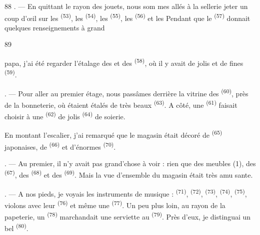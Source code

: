 \begin{VUpage}[90]{88}
. --- En quittant le rayon des jouets, nous som\cc
mes allés à la sellerie jeter un coup d'œil sur les\nl
{}\textsuperscript{(53)}, les \textsuperscript{(54)}, les \textsuperscript{(55)}, les\nl
{}\textsuperscript{(56)} et les  Pendant que le \nl
{}\textsuperscript{(57)} donnait quelques renseignements à grand
\parplein
\end{VUpage}

\begin{VUpage}[91]{89}

\VUcontinue
papa, j'ai été regarder l'étalage des  et\nl
des \textsuperscript{(58)}, où il y avait de jolis  et\nl
de fines \textsuperscript{(59)}.

. --- Pour aller au premier étage, nous passâmes\nl
derrière la vitrine des \textsuperscript{(60)}, près de la\nl
bonneterie, où étaient étalés de très beaux \cc
{}\textsuperscript{(63)}. A côté, une \textsuperscript{(61)}\nl
faisait choisir à une \textsuperscript{(62)} de jolis \textsuperscript{(64)}\nl
de soierie.

\VUblancAlinea
En montant l'escalier, j'ai remarqué que le magasin\nl
était décoré de \textsuperscript{(65)} japonaises, de \cc
{}\textsuperscript{(66)} et d'énormes \textsuperscript{(70)}.

. --- Au premier, il n'y avait pas grand'chose à\nl
voir : rien que des meubles (1), des \textsuperscript{(67)},\nl
des \textsuperscript{(68)} et des \textsuperscript{(69)}.\nl
Mais la vue d'ensemble du magasin était très amu\cc
sante.

. --- A nos pieds, je voyais les instruments de\nl
musique : \textsuperscript{(71)}, \textsuperscript{(72)}, \textsuperscript{(73)},\nl
{}\textsuperscript{(74)}, \textsuperscript{(75)}, violons\nl
avec leur \textsuperscript{(76)} et même une \textsuperscript{(77)}.\nl
Un peu plus loin, au rayon de la papeterie, un \cc
{}\textsuperscript{(78)} marchandait une serviette au \textsuperscript{(79)}.\nl
Près d'eux, je distinguai un bel \textsuperscript{(80)}.


\end{VUpage}
